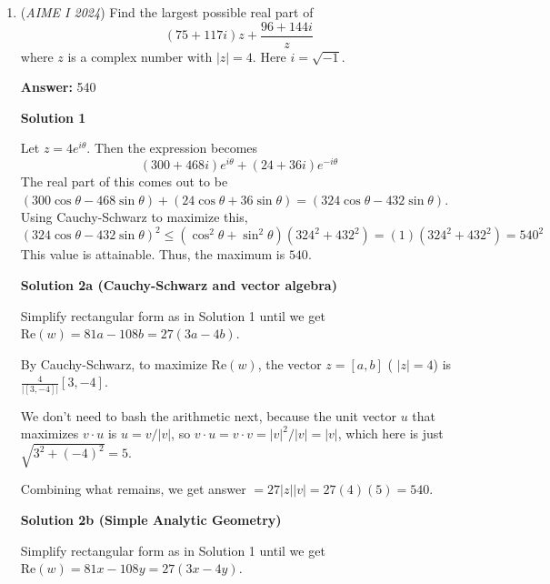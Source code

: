 \begin{enumerate}
 For the second move (upward), we always have 7 choices to stop at (the top, one point before the top, two points before the top... 1 point from the bottom), and the fourth move will always have 1 choice, which is the move that reaches the final point.

 Finally, we multiply by 2 to account for the URURU case, which gives us a total of $21 \cdot 7 \cdot 2 = \boxed{294}$  paths.

 


	\item (\textit{AIME I 2024}) Find the largest possible real part of 
 \[(75+117i)z+\frac{96+144i}{z}\]where $z$ is a complex number with $|z|=4$. Here $i = \sqrt{-1}$.


 
 \textbf{Answer: }540



\textbf{Solution 1}

Let $z=4e^{i\theta}$. Then the expression becomes 
 \[(300+468i)e^{i\theta}+(24+36i)e^{-i\theta}\] The real part of this comes out to be $(300\cos \theta - 468 \sin \theta)+(24\cos \theta + 36 \sin \theta) = (324\cos \theta - 432 \sin \theta)$. Using Cauchy-Schwarz to maximize this, 
 \[(324\cos \theta - 432 \sin \theta)^2 \leq (\cos ^2 \theta+\sin ^2 \theta)(324^2+432^2) = (1)(324^2+432^2) = 540^2\] This value is attainable. Thus, the maximum is $\boxed{540}$.

 



\textbf{Solution 2a (Cauchy-Schwarz and vector algebra)}

Simplify rectangular form as in Solution 1 until we get $\text{Re}(w)=81a-108b = 27(3a-4b)$. 

 By Cauchy-Schwarz, to maximize $\text{Re}(w)$, the vector $z=[a,b]$ ( $|z| =4$) is $\frac{4}{|[3,-4]|}[3,-4]$. 

 We don't need to bash the arithmetic next, because the unit vector $u$  that maximizes $v \cdot u$ is $u=v/|v|$, so $v \cdot u= v\cdot v = |v|^2/|v| = |v|$, which here is just $\sqrt{3^2+(-4)^2} =5$.

 Combining what remains, we get answer $= 27 |z| |v|  = 27(4)(5)=\boxed{540}$.

 



\textbf{Solution 2b (Simple Analytic Geometry)}

Simplify rectangular form as in Solution 1 until we get $\text{Re}(w)=81x-108y = 27(3x-4y)$. 


\end{enumerate}

